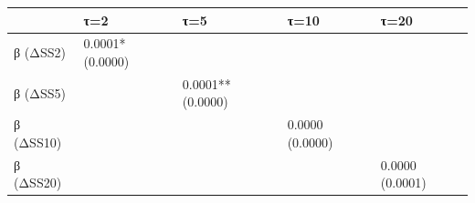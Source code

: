 \begin{tabular}{lllll}
\toprule
 & τ=2 & τ=5 & τ=10 & τ=20 \\
\midrule
β (ΔSS2) & 0.0001*
(0.0000) &  &  &  \\
β (ΔSS5) &  & 0.0001**
(0.0000) &  &  \\
β (ΔSS10) &  &  & 0.0000
(0.0000) &  \\
β (ΔSS20) &  &  &  & 0.0000
(0.0001) \\
\bottomrule
\end{tabular}
